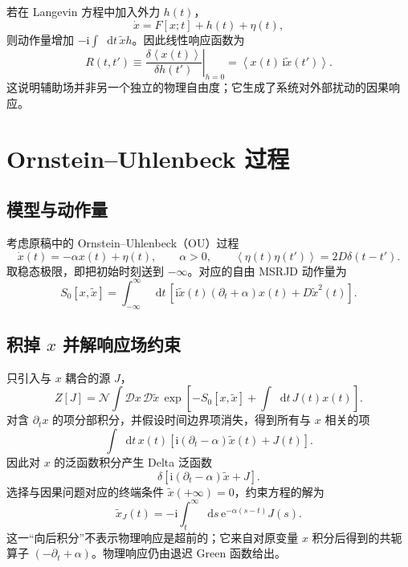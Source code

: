 \documentclass[UTF8,11pt,a4paper]{ctexart}
\newcommand{\dd}{\mathop{}\!\mathrm{d}}
\newcommand{\ii}{\mathrm{i}}
\newcommand{\ee}{\mathrm{e}}
\newcommand{\D}{\mathcal D}
\newcommand{\avg}[1]{\left\langle #1\right\rangle}
\begin{document}
若在 Langevin 方程中加入外力 $h(t)$，
\begin{equation}
  \dot x=F[x;t]+h(t)+\eta(t),
\end{equation}
则动作量增加 $-\ii\int\dd t\,\widetilde xh$。因此线性响应函数为
\begin{equation}
  R(t,t')
  \equiv\left.
  \frac{\delta\avg{x(t)}}{\delta h(t')}
  \right|_{h=0}
  =\avg{x(t)\,\ii\widetilde x(t')}.
  \label{eq:response-field-meaning}
\end{equation}
这说明辅助场并非另一个独立的物理自由度；它生成了系统对外部扰动的因果响应。

\section{Ornstein--Uhlenbeck 过程}

\subsection{模型与动作量}

考虑原稿中的 Ornstein--Uhlenbeck（OU）过程
\begin{equation}
  \dot x(t)=-\alpha x(t)+\eta(t),
  \qquad
  \alpha>0,
  \qquad
  \avg{\eta(t)\eta(t')}=2D\delta(t-t').
  \label{eq:ou-process}
\end{equation}
取稳态极限，即把初始时刻送到 $-\infty$。对应的自由 MSRJD 动作量为
\begin{equation}
  S_0[x,\widetilde x]
  =\int_{-\infty}^{\infty}\dd t\,
  \left[
  \ii\widetilde x(t)(\partial_t+\alpha)x(t)
  +D\widetilde x^2(t)
  \right].
  \label{eq:ou-action}
\end{equation}

\subsection{\texorpdfstring{积掉 $x$ 并解响应场约束}{积掉 x 并解响应场约束}}

只引入与 $x$ 耦合的源 $J$，
\begin{equation}
  Z[J]
  =\mathcal N\int\D x\,\D\widetilde x\,
  \exp\!\left[-S_0[x,\widetilde x]
  +\int\dd t\,J(t)x(t)\right].
  \label{eq:ou-generating-functional}
\end{equation}
对含 $\partial_t x$ 的项分部积分，并假设时间边界项消失，得到所有与 $x$ 相关的项
\begin{equation}
  \int\dd t\,x(t)
  \left[
  \ii(\partial_t-\alpha)\widetilde x(t)+J(t)
  \right].
\end{equation}
因此对 $x$ 的泛函数积分产生 Delta 泛函数
\begin{equation}
  \delta\!\left[
  \ii(\partial_t-\alpha)\widetilde x+J
  \right].
  \label{eq:ou-response-delta}
\end{equation}
选择与因果问题对应的终端条件 $\widetilde x(+\infty)=0$，约束方程的解为
\begin{equation}
  \boxed{
  \widetilde x_J(t)
  =-\ii\int_t^\infty\dd s\,
  \ee^{-\alpha(s-t)}J(s).
  }
  \label{eq:ou-response-field-solution}
\end{equation}
这一“向后积分”不表示物理响应是超前的；它来自对原变量 $x$ 积分后得到的共轭算子 $(-\partial_t+\alpha)$。物理响应仍由退迟 Green 函数给出。
\end{document}
